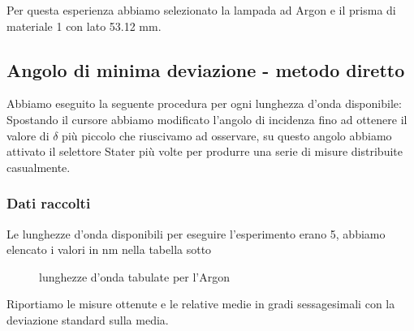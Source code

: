 \documentclass[a4paper]{article}
\theoremstyle{definition}
\begin{document}
Per questa esperienza abbiamo selezionato la lampada ad Argon e il prisma di materiale 1 con lato 53.12 mm.

 
\subsection{Angolo di minima deviazione - metodo diretto}
Abbiamo eseguito la seguente procedura per ogni lunghezza d'onda disponibile:\\
 Spostando il cursore abbiamo modificato l'angolo di incidenza fino ad ottenere il valore di \(\delta\) più piccolo che riuscivamo ad osservare, su questo angolo abbiamo attivato il selettore Stater più volte per produrre una serie di misure distribuite casualmente.
 
\subsubsection{Dati raccolti}

Le lunghezze d'onda disponibili per eseguire l'esperimento erano 5, abbiamo elencato i valori in nm nella tabella sotto


\begin{figure}[!htbp]
    	\captionsetup{labelformat=empty}
\caption{lunghezze d'onda tabulate per l'Argon}

    \end{figure}

\noindent Riportiamo le misure ottenute e le relative medie in gradi sessagesimali con la deviazione standard sulla media. \\
\end{document}

